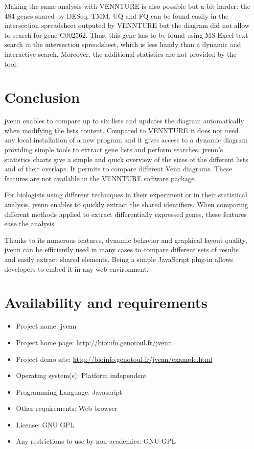 \documentclass[11pt]{bmc_article_s50}
\begin{document}
Making the same analysis with VENNTURE is also possible but a bit harder: the
484 genes shared by DESeq, TMM, UQ and FQ can be found easily in the
intersection spreadsheet outputed by VENNTURE but the diagram did not allow
to search for gene G002562. Thus, this gene has to be found using MS-Excel text
search in the intersection spreadsheet, which is less handy than a dynamic and
interactive search. Moreover, the additional statistics are not provided by the
tool.

\section*{Conclusion}

jvenn enables to compare up to six lists and updates the diagram automatically
when modifying the lists content. Compared to VENNTURE it does not need any
local installation of a new program and it gives access to a dynamic diagram
providing simple tools to extract gene lists and perform searches.
jvenn's statistics charts give a simple and quick overview of the sizes of the
different lists and of their overlaps. It permits to compare different Venn
diagrams. These features are not available in the VENNTURE software package.

For biologists using different techniques in their experiment or in their
statistical analysis, jvenn enables to quickly extract the shared identifiers.
When comparing different methods applied to extract differentially expressed
genes, these features ease the analysis.

Thanks to its numerous features, dynamic behavior and graphical layout quality,
jvenn can be efficiently used in many cases to compare different sets of results
and easily extract shared elements. Being a simple JavaScript plug-in allows
developers to embed it in any web environment.

\section*{Availability and requirements}
\begin{itemize}
  \item Project name: jvenn
  \item Project home page: \url{http://bioinfo.genotoul.fr/jvenn}
  \item Project demo site: \url{http://bioinfo.genotoul.fr/jvenn/example.html} 
  \item Operating system(s): Platform independent
  \item Programming Language: Javascript
  \item Other requirements: Web browser
  \item License: GNU GPL
  \item Any restrictions to use by non-academics: GNU GPL
\end{itemize}
\end{document}
